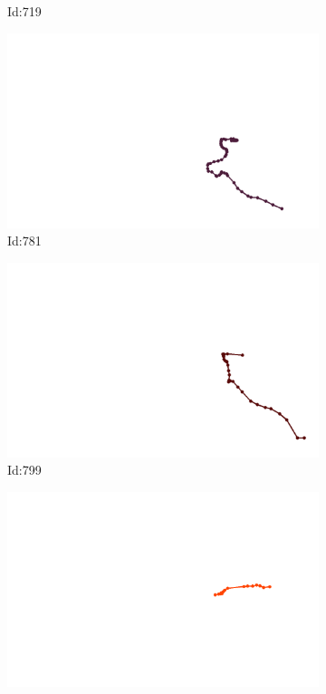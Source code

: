 \documentclass[12pt,twoside]{report}
\begin{document}
\begin{figure}
\begin{subfigure}[b]{0.20\textwidth}
\caption{Id:719}
\end{subfigure}
\begin{subfigure}[b]{0.20\textwidth}
\centering
\includegraphics[width=\textwidth]{../trajectories/781.png}
\caption{Id:781}
\end{subfigure}
\begin{subfigure}[b]{0.20\textwidth}
\centering
\includegraphics[width=\textwidth]{../trajectories/799.png}
\caption{Id:799}
\end{subfigure}
\begin{subfigure}[b]{0.20\textwidth}
\centering
\includegraphics[width=\textwidth]{../trajectories/800.png}

\end{subfigure}
\end{figure}
\end{document}
